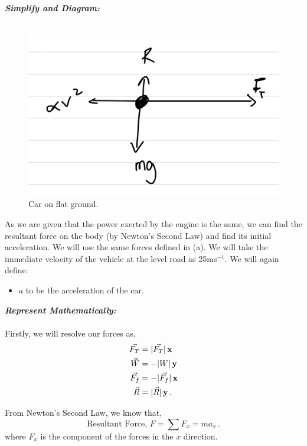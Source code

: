 \begin{subquestions}
\begin{subsubquestions}
\textbf{\textit{Simplify and Diagram:}} \\ \\
\begin{figure}[H]
	\begin{center}
		\includegraphics[scale=0.25]{../2009/figures/2009q5-2}
		\caption{\label{2009:q5:Diagram2} Car on flat ground.}
	\end{center}
\end{figure}	
As we are given that the power exerted by the engine is the same, we can find the resultant force on the body (by Newton's Second Law) and find its initial acceleration. We will use the same forces defined in (a). We will take the immediate velocity of the vehicle at the level road as 25ms$^{-1}$.
We will again define:
\begin{itemize}
	\item $a$ to be the acceleration of the car.
\end{itemize}



\textbf{\textit{Represent Mathematically:}} \\ \\
Firstly, we will resolve our forces as,
\begin{align}
	\vec{F_T} & = |\vec{F_T}|\,\mathbf{x} \\
	\vec{W} & = -|W|\,\mathbf{y} \\
	\vec{F_f} & = -|\vec{F_f}|\,\mathbf{x} \\
	\vec{R} & = |\vec{R}|\,\mathbf{y} \,.
\end{align}

From Newton's Second Law, we know that,
\begin{equation}
	\text{Resultant Force, }F = \sum F_x = ma_x \label{2009:q5:FxEqn2} \,.
\end{equation}
where $F_x$ is the component of the forces in the $x$ direction.





\end{subsubquestions}
\end{subquestions}

